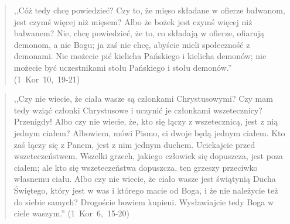 \documentclass[10pt,a4paper,oneside]{article}
\begin{document}
\begin{quote}
,,Cóż tedy chcę powiedzieć? Czy to, że mięso składane w ofierze bałwanom, jest czymś więcej niż mięsem? Albo że bożek jest czymś więcej niż bałwanem? Nie, chcę powiedzieć, że to, co składają w ofierze, ofiarują demonom, a nie Bogu; ja zaś nie chcę, abyście mieli społeczność z demonami. Nie możecie pić kielicha Pańskiego i kielicha demonów; nie możecie być uczestnikami stołu Pańskiego i stołu demonów.'' \mbox{(1 Kor 10, 19-21)}
\end{quote}
\begin{quote}
,,Czy nie wiecie, że ciała wasze są członkami Chrystusowymi? Czy mam tedy wziąć członki Chrystusowe i uczynić je członkami wszetecznicy? Przenigdy! Albo czy nie wiecie, że, kto się łączy z wszetecznicą, jest z nią jednym ciałem? Albowiem, mówi Pismo, ci dwoje będą jednym ciałem. Kto zaś łączy się z Panem, jest z nim jednym duchem. Uciekajcie przed wszeteczeństwem. Wszelki grzech, jakiego człowiek się dopuszcza, jest poza ciałem; ale kto się wszeteczeństwa dopuszcza, ten grzeszy przeciwko własnemu ciału. Albo czy nie wiecie, że ciało wasze jest świątynią Ducha Świętego, który jest w was i którego macie od Boga, i że nie należycie też do siebie samych? Drogoście bowiem kupieni. Wysławiajcie tedy Boga w ciele waszym.'' \mbox{(1 Kor 6, 15-20)}
\end{quote}
\end{document}
